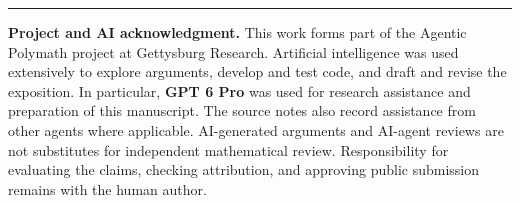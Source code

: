 \documentclass[11pt,a4paper]{article}
\numberwithin{equation}{section}
\theoremstyle{definition}
\theoremstyle{remark}
\begin{document}




\appendix


\par\bigskip
\noindent\rule{\linewidth}{0.3pt}
\par\smallskip
\noindent\textbf{Project and AI acknowledgment.}
This work forms part of the Agentic Polymath project at Gettysburg Research. Artificial intelligence was used extensively to explore arguments, develop and test code, and draft and revise the exposition. In particular, \textbf{GPT 6 Pro} was used for research assistance and preparation of this manuscript. The source notes also record assistance from other agents where applicable. AI-generated arguments and AI-agent reviews are not substitutes for independent mathematical review. Responsibility for evaluating the claims, checking attribution, and approving public submission remains with the human author.
\end{document}
